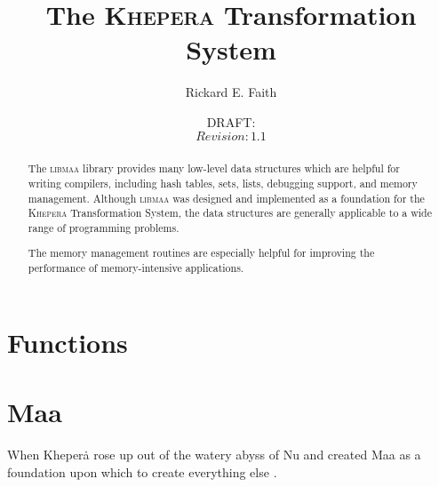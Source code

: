 \documentclass[draft]{article}
\newcommand{\libmaa}{\textsc{libmaa}\xspace}
\newcommand{\kheperalong}{\textsc{Khepera} Transformation System\xspace}
\newcommand{\Khepera}{Kheper\.a\xspace}
\newcommand{\Maa}{Maa\xspace}
\begin{document}

\title{The \kheperalong}
\author{Rickard E. Faith} \date{DRAFT: \FileRevised \\ $Revision: 1.1 $}

\maketitle\tableofcontents

\clearpage

\begin{abstract}
  The \libmaa library provides many low-level data structures which are
  helpful for writing compilers, including hash tables, sets, lists,
  debugging support, and memory management.  Although \libmaa was designed
  and implemented as a foundation for the \kheperalong, the data structures
  are generally applicable to a wide range of programming problems.

  The memory management routines are especially helpful for improving the
  performance of memory-intensive applications.
\end{abstract}

\clearpage
\section{Functions}


\clearpage
\appendix

\section{\Maa}

When \Khepera rose up out of the watery abyss of Nu and created \Maa as a
foundation upon which to create everything else
\cite[pp.~295--8]{faith:Budge04b}.


\end{document}
